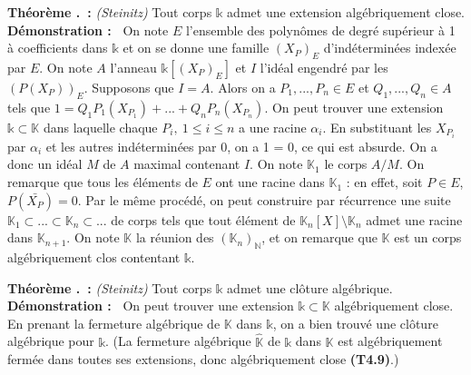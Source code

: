 \documentclass[5pt,a4paper]{article}
\newcounter{thm}[section]
\renewcommand{\thethm}{\thesection.\arabic{thm}}
\newcommand{\thm}[1]{\stepcounter{thm}\noindent\textbf{Théorème \thethm ~:} #1 \newline}
\newcommand{\demo}[1]{\textbf{Démonstration :~} #1 \newline}
\begin{document}
\begin{onehalfspacing}
\thm{\textit{(Steinitz)} Tout corps $\mathds{k}$ admet une extension algébriquement close.}
\demo{On note $E$ l'ensemble des polynômes de degré supérieur à 1 à coefficients dans $\mathds{k}$ et on se donne une famille $(X_P)_E$ d'indéterminées indexée par $E$. On note $A$ l'anneau $\mathds{k}[(X_P)_E]$ et $I$ l'idéal engendré par les $(P(X_P))_E$. Supposons que $I = A$. Alors on a $P_1, ..., P_n \in E$ et $Q_1, ..., Q_n \in A$ tels que $1 = Q_1P_1(X_{P_1}) + ... + Q_nP_n(X_{P_n})$. On peut trouver une extension $\mathds{k} \subset \mathbb{K}$ dans laquelle chaque $P_i,~1 \leq i \leq n$ a une racine $\alpha_i$. En substituant les $X_{P_i}$ par $\alpha_i$ et les autres indéterminées par 0, on a 1 = 0, ce qui est absurde. On a donc un idéal $M$ de $A$ maximal contenant $I$. On note $\mathbb{K}_1$ le corps $A/M$. On remarque que tous les éléments de $E$ ont une racine dans $\mathbb{K}_1$ : en effet, soit $P \in E$, $P(\bar{X_P}) = 0$. Par le même procédé, on peut construire par récurrence une suite $\mathbb{K}_1 \subset ... \subset \mathbb{K}_n \subset ...$ de corps tels que tout élément de $\mathbb{K}_n[X] \setminus \mathbb{K}_n$ admet une racine dans $\mathbb{K}_{n+1}$. On note $\mathbb{K}$ la réunion des $(\mathbb{K}_n)_\mathbb{N}$, et on remarque que $\mathbb{K}$ est un corps algébriquement clos contentant $\mathds{k}$.}


\thm{\textit{(Steinitz)} Tout corps $\mathds{k}$ admet une clôture algébrique.}
\demo{On peut trouver une extension $\mathds{k} \subset \mathbb{K}$ algébriquement close. En prenant la fermeture algébrique de $\mathbb{K}$ dans $\mathds{k}$, on a bien trouvé une clôture algébrique pour $\mathds{k}$. (La fermeture algébrique $\hat{\mathbb{K}}$ de $\mathds{k}$ dans $\mathbb{K}$ est algébriquement fermée dans toutes ses extensions, donc algébriquement close \textbf{(T4.9)}.)}



\end{onehalfspacing}
\end{document}
